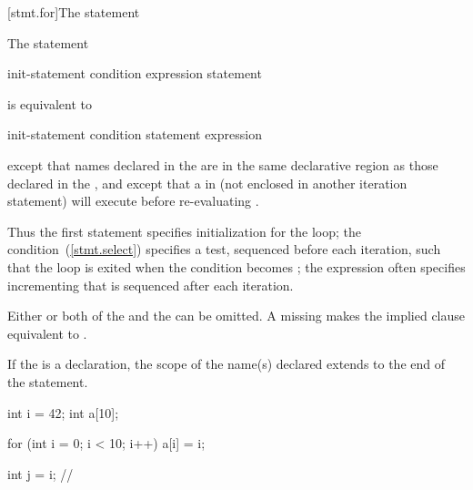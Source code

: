 [stmt.for]{The  statement}%

\pnum
The  statement

\begin{ncbnf}
 init-statement condition\opt{} \terminal{;} expression\opt{} \terminal{)} statement
\end{ncbnf}

is equivalent to

\begin{ncbnftab}
\terminal{\{}\br
\>init-statement\br
\> condition \terminal{) \{}\br
\>\>statement\br
\>\>expression \terminal{;}\br
\>\terminal{\}}\br
\terminal{\}}
\end{ncbnftab}

except that names declared in the  are in
the same declarative region as those declared in the
, and except that a
%
 in  (not enclosed in another
iteration statement) will execute  before
re-evaluating .
\begin{note}
Thus the first statement specifies initialization for the loop; the
condition~(\ref{stmt.select}) specifies a test, sequenced before each
iteration, such that the loop is exited when the condition becomes
; the expression often specifies incrementing that is
sequenced after each iteration.
\end{note}

\pnum
Either or both of the 
and the  can be omitted.
A missing 
makes the implied  clause
equivalent to .

\pnum
{}%
%
If the  is a declaration, the scope of the
name(s) declared extends to the end of the  statement.
\begin{example}

\begin{codeblock}
int i = 42;
int a[10];

for (int i = 0; i < 10; i++)
  a[i] = i;

int j = i;          // 
\end{codeblock}
\end{example}

